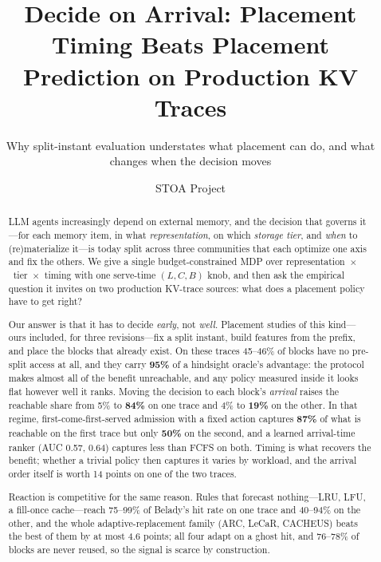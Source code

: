 \documentclass[sigconf, nonacm]{acmart}
\begin{document}
\title{Decide on Arrival: Placement Timing Beats Placement Prediction on Production KV Traces}
\subtitle{Why split-instant evaluation understates what placement can do, and what changes when the
decision moves}

\author{STOA Project}

\begin{abstract}
LLM agents increasingly depend on external memory, and the decision that governs it---for each memory
item, in what \emph{representation}, on which \emph{storage tier}, and \emph{when} to (re)materialize
it---is today split across three communities that each optimize one axis and fix the others. We give a
single budget-constrained MDP over representation~$\times$~tier~$\times$~timing with one serve-time
$(L,C,B)$ knob, and then ask the empirical question it invites on two production KV-trace sources: what
does a placement policy have to get right?

Our answer is that it has to decide \emph{early}, not \emph{well}. Placement studies of this kind---ours
included, for three revisions---fix a split instant, build features from the prefix, and place the
blocks that already exist. On these traces 45--46\% of blocks have no pre-split access at all, and they
carry \textbf{95\%} of a hindsight oracle's advantage: the protocol makes almost all of the benefit
unreachable, and any policy measured inside it looks flat however well it ranks. Moving the decision to
each block's \emph{arrival} raises the reachable share from 5\% to \textbf{84\%} on one trace and 4\% to
\textbf{19\%} on the other. In that regime, first-come-first-served admission with a fixed action
captures \textbf{87\%} of what is reachable on the first trace but only \textbf{50\%} on the second, and
a learned arrival-time ranker (AUC 0.57, 0.64) captures less than FCFS on both. Timing is what recovers
the benefit; whether a trivial policy then captures it varies by workload, and the arrival order itself
is worth 14 points on one of the two traces.

Reaction is competitive for the same reason. Rules that forecast nothing---LRU, LFU, a fill-once
cache---reach 75--99\% of Belady's hit rate on one trace and 40--94\% on the other, and the whole
adaptive-replacement family (ARC, LeCaR, CACHEUS) beats the best of them by at most 4.6 points; all four
adapt on a ghost hit, and 76--78\% of blocks are never reused, so the signal is scarce by construction.


\end{abstract}
\end{document}
